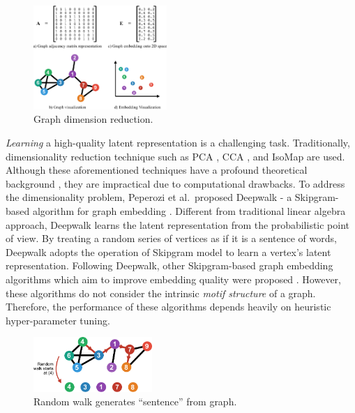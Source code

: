 \documentclass[letterpaper]{article}
\begin{document}
        \begin{figure}
            \centering
            \includegraphics[width=0.45\textwidth]{fig1_dimrec}
            \caption{Graph dimension reduction.}
            \label{fig:dimrec}
        \end{figure}

        \emph{Learning} a high-quality latent representation is a challenging task. Traditionally,
        dimensionality reduction technique such as PCA \cite{pca}, CCA \cite{cca}, and IsoMap 
        \cite{isomap} are used. Although these aforementioned techniques have a profound theoretical
        background \cite{dimrecrev}, they are impractical due to computational drawbacks. To address
        the dimensionality problem, Peperozi et al.\ proposed Deepwalk - a Skipgram-based algorithm
        for graph embedding \cite{deepwalk}. Different from traditional linear algebra approach,
        Deepwalk learns the latent representation from the probabilistic point of view. By treating
        a random series of vertices as if it is a sentence of words, Deepwalk adopts the operation
        of Skipgram model \cite{skipgram} to learn a vertex's latent representation. Following
        Deepwalk, other Skipgram-based graph embedding algorithms which aim to improve embedding
        quality were proposed \cite{grarep, line, planetoid, node2vec}. However, these algorithms
        do not consider the intrinsic \emph{motif structure} of a graph. Therefore, the performance
        of these algorithms depends heavily on heuristic hyper-parameter tuning.

        \begin{figure}
            \centering
            \includegraphics[width=0.4\textwidth]{fig2_congen}
            \caption{Random walk generates ``sentence'' from graph.}
            \label{fig:congen}
        \end{figure}
\end{document}
